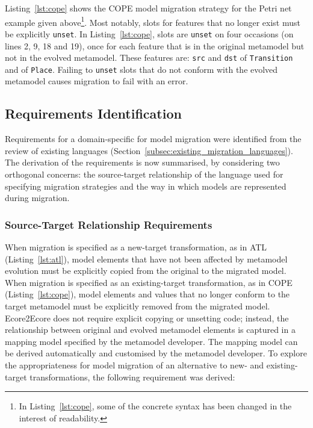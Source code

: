 Listing~\ref{lst:cope} shows the COPE model migration strategy for the Petri net example given above\footnote{In Listing~\ref{lst:cope}, some of the concrete syntax has been changed in the interest of readability.}. Most notably, slots for features that no longer exist must be explicitly \texttt{unset}. In Listing~\ref{lst:cope}, slots are \texttt{unset} on four occasions (on lines 2, 9, 18 and 19), once for each feature that is in the original metamodel but not in the evolved metamodel. These features are: \texttt{src} and \texttt{dst} of \texttt{Transition} and of \texttt{Place}. Failing to \texttt{unset} slots that do not conform with the evolved metamodel causes migration to fail with an error.

\subsection{Requirements Identification}
\label{subsec:analysis}
Requirements for a domain-specific for model migration were identified from the review of existing languages (Section~\ref{subsec:existing_migration_languages}). The derivation of the requirements is now summarised, by considering two orthogonal concerns: the source-target relationship of the language used for specifying migration strategies and the way in which models are represented during migration. %


\subsubsection{Source-Target Relationship Requirements}
When migration is specified as a new-target transformation, as in ATL (Listing~\ref{lst:atl}), model elements that have not been affected by metamodel evolution must be explicitly copied from the original to the migrated model. When migration is specified as an existing-target transformation, as in COPE (Listing~\ref{lst:cope}), model elements and values that no longer conform to the target metamodel must be explicitly removed from the migrated model. Ecore2Ecore does not require explicit copying or unsetting code; instead, the relationship between original and evolved metamodel elements is captured in a mapping model specified by the metamodel developer. The mapping model can be derived automatically and customised by the metamodel developer. To explore the appropriateness for model migration of an alternative to new- and existing-target transformations, the following requirement was derived:


